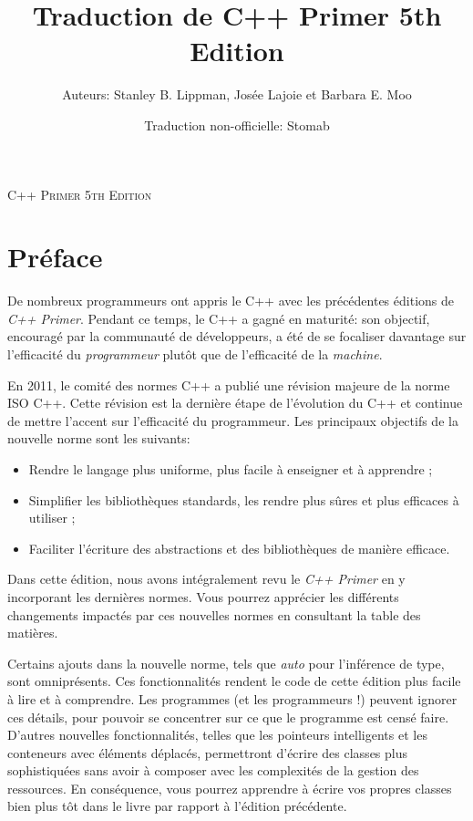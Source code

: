 \documentclass[a4paper,18pt,twoside]{report}
\title{Traduction de C++ Primer 5th Edition}
\author{Auteurs: Stanley B. Lippman, Josée Lajoie et Barbara E. Moo}
\date{Traduction non-officielle: Stomab}
\begin{document}
\begin{titlepage}

	\textsc{\LARGE C++ Primer 5th Edition}

\end{titlepage}
\maketitle

\tableofcontents


\newpage

\section{Préface}
De nombreux programmeurs ont appris le C++ avec les précédentes éditions de \textit{C++ Primer}. Pendant ce temps, le C++ a gagné en maturité: son objectif, encouragé par la communauté de développeurs, a été de se focaliser davantage sur l'efficacité du \textit{programmeur} plutôt que de l'efficacité de la \textit{machine}.

En 2011, le comité des normes C++ a publié une révision majeure de la norme ISO C++. Cette révision est la dernière étape de l'évolution du C++ et continue de mettre l'accent sur l'efficacité du programmeur. Les principaux objectifs de la nouvelle norme sont les suivants:

\medbreak
\begin{itemize}
	\item[\textbullet] Rendre le langage plus uniforme, plus facile à enseigner et à apprendre ;
	\item[\textbullet] Simplifier les bibliothèques standards, les rendre plus sûres et plus efficaces à utiliser ;
	\item[\textbullet] Faciliter l'écriture des abstractions et des bibliothèques de manière efficace.
\end{itemize}

\medbreak
Dans cette édition, nous avons intégralement revu le \textit{C++ Primer} en y incorporant les dernières normes. Vous pourrez apprécier les différents changements impactés par ces nouvelles normes en consultant la table des matières.

Certains ajouts dans la nouvelle norme, tels que \textit{auto} pour l'inférence de type, sont omniprésents. Ces fonctionnalités rendent le code de cette édition plus facile à lire et à comprendre. Les programmes (et les programmeurs !) peuvent ignorer ces détails, pour pouvoir se concentrer sur ce que le programme est censé faire. D'autres nouvelles fonctionnalités, telles que les pointeurs intelligents et les conteneurs avec éléments déplacés, permettront d'écrire des classes plus sophistiquées sans avoir à composer avec les complexités de la gestion des ressources. En conséquence, vous pourrez apprendre à écrire vos propres classes bien plus tôt dans le livre par rapport à l'édition précédente.
\end{document}
